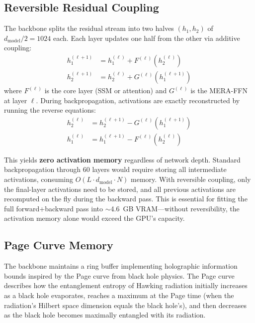 \documentclass[11pt,a4paper,twocolumn]{article}
\begin{document}
\subsection{Reversible Residual Coupling}

The backbone splits the residual stream into two halves $(h_1, h_2)$ of $d_{\mathrm{model}}/2 = 1024$ each.
Each layer updates one half from the other via additive coupling:
\begin{align}
h_1^{(\ell+1)} &= h_1^{(\ell)} + F^{(\ell)}(h_2^{(\ell)}) \label{eq:rev_fwd1} \\
h_2^{(\ell+1)} &= h_2^{(\ell)} + G^{(\ell)}(h_1^{(\ell+1)}) \label{eq:rev_fwd2}
\end{align}
where $F^{(\ell)}$ is the core layer (SSM or attention) and $G^{(\ell)}$ is the MERA-FFN at layer $\ell$.
During backpropagation, activations are exactly reconstructed by running the reverse equations:
\begin{align}
h_2^{(\ell)} &= h_2^{(\ell+1)} - G^{(\ell)}(h_1^{(\ell+1)}) \label{eq:rev_bwd1} \\
h_1^{(\ell)} &= h_1^{(\ell+1)} - F^{(\ell)}(h_2^{(\ell)}) \label{eq:rev_bwd2}
\end{align}

This yields \textbf{zero activation memory} regardless of network depth.
Standard backpropagation through 60 layers would require storing all intermediate activations, consuming $O(L \cdot d_{\mathrm{model}} \cdot N)$ memory.
With reversible coupling, only the final-layer activations need to be stored, and all previous activations are recomputed on the fly during the backward pass.
This is essential for fitting the full forward+backward pass into $\sim$4.6~GB VRAM---without reversibility, the activation memory alone would exceed the GPU's capacity.

\subsection{Page Curve Memory}

The backbone maintains a ring buffer implementing holographic information bounds inspired by the Page curve from black hole physics.
The Page curve describes how the entanglement entropy of Hawking radiation initially increases as a black hole evaporates, reaches a maximum at the Page time (when the radiation's Hilbert space dimension equals the black hole's), and then decreases as the black hole becomes maximally entangled with its radiation.
\end{document}
